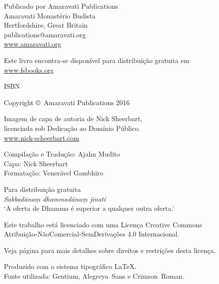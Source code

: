 \cleartoverso
\thispagestyle{empty}

{\copyrightsize
\centering
\setlength{\parindent}{0pt}%
\setlength{\parskip}{0.8\baselineskip}%

\thetitle

Publicado por Amaravati Publications\\
Amaravati Monastério Budista\\
Hertfordshire, Great Britain\\
publications@amaravati.org\\
\href{http://amaravati.org}{www.amaravati.org}

Este livro encontra-se disponível para distribuição gratuita em\\
\href{http://fsbooks.org/}{www.fsbooks.org}

ISBN \theISBN

Copyright \copyright\ Amaravati Publications 2016

Imagem de capa de autoria de Nick Sheerbart,\\
licenciada sob Dedicação ao Domínio Público.\\
\href{http://www.nick-scheerbart.com/}{www.nick-scheerbart.com}

Compilação e Tradução: Ajahn Mudito\\
Capa: Nick Sheerbart\\
Formatação: Venerável Gambhīro

\vfill

{\footnotesize

Para distribuição gratuita\\
\textit{Sabbadānaṃ dhammadānaṃ jinati}\\
‘A oferta de Dhamma é superior a qualquer outra oferta.’

Este trabalho está licenciado com uma Licença Creative Commons\\
Atribuição-NãoComercial-SemDerivações 4.0 Internacional.

Veja página \pageref{copyright-details} para mais detalhes sobre direitos e restrições desta licença.

Produzido com o sistema tipográfico \LaTeX.\\
Fonte utilizada: Gentium, Alegreya~Sans e Crimson~Roman.

\theEditionInfo

}}
